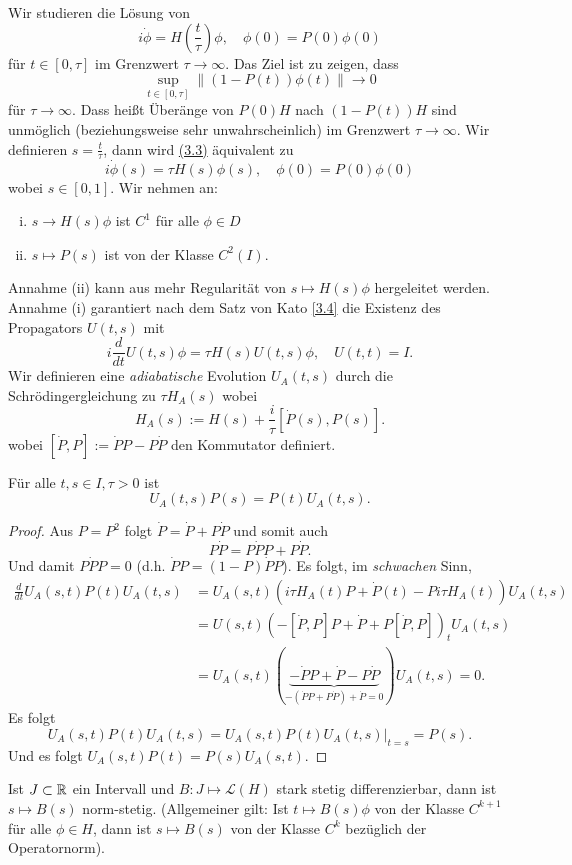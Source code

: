 \documentclass{mycourse}
\renewcommand{\eqref}[1]{\hyperref[#1]{(#1)}}
\begin{document}
Wir studieren die Lösung von
\begin{equation}\label{3.3}
i \dot \phi = H(\frac{t}{\tau}) \phi,\quad \phi(0)= P(0) \phi(0)
\end{equation}
für $t\in [0, \tau]$ im Grenzwert $\tau \to \infty$. Das Ziel ist zu zeigen, dass
\[
\sup_{t\in [0, \tau]} \| (1- P(t)) \phi(t) \| \to 0
\]
für $\tau \to \infty$. Dass heißt Überänge von $P(0) H$ nach $(1- P(t))H$ sind unmöglich (beziehungsweise sehr unwahrscheinlich) im Grenzwert $\tau \to \infty$. Wir definieren $s=\frac{t}{\tau}$, dann wird \eqref{3.3} äquivalent zu
\[
i \dot \phi(s) = \tau H(s) \phi(s), \quad \phi(0)= P(0) \phi(0)
\]
wobei $s\in [0,1]$. Wir nehmen an:
\begin{enumerate}[(i)]
\item $s\to H(s) \phi$ ist $C^1$ für alle $\phi\in D$
\item $s\mapsto P(s)$ ist von der Klasse $C^2(I)$.
\end{enumerate}
Annahme (ii) kann aus mehr Regularität von $s\mapsto H(s) \phi$ hergeleitet werden. Annahme (i) garantiert nach dem Satz von Kato \ref{3.4} die Existenz des Propagators $U(t,s)$ mit
\[
i \frac{d}{dt} U(t,s) \phi= \tau H(s) U(t,s) \phi, \quad U(t,t) = I.
\]
Wir definieren eine \emph{adiabatische} Evolution $U_A(t,s)$ durch die Schrödingergleichung zu $\tau H_A(s)$ wobei
\[
H_A(s):= H(s) + \frac{i}{\tau} [\dot P(s), P(s)].
\]
wobei $[\dot P, P]:= \dot P P - P \dot P$ den Kommutator definiert.
\begin{lem} Für alle $t,s \in I, \tau >0$ ist
\[
U_A(t,s) P(s) = P(t) U_A(t,s).
\]
\end{lem}
\begin{proof}
Aus $P=P^2$ folgt $\dot P=\dot P + P \dot P$ und somit auch
\[
P\dot P = P \dot P P + P \dot P.
\]
Und damit $P\dot P P =0$ (d.h. $\dot P P = (1-P) \dot PP$). Es folgt, im \emph{schwachen} Sinn,
\begin{align*}
\frac{d}{dt} U_A(s,t) P(t) U_A(t,s)&= U_A(s,t) (i \tau H_A(t) P+ \dot P(t)-P i\tau H_A(t))U_A(t,s)\\
&=U(s,t)(-[\dot P, P] P+ \dot P + P [\dot P, P])_t U_A(t,s)\\
&= U_A(s,t) (\underbrace{-\dot P P + \dot P - P \dot P}_{-(\dot P P + P \dot P) + \dot P=0}) U_A(t,s)=0.
\end{align*}
Es folgt
\[
U_A(s,t) P(t) U_A(t,s) = U_A(s,t) P(t) U_A(t,s)\big|_{t=s} = P(s).
\]
Und es folgt $U_A(s,t)P(t)=P(s) U_A(s,t)$.
\end{proof}

\begin{lem}\label{3.6}
Ist $J\subset \mathbb{R}$ ein Intervall und $B: J \mapsto \mathcal L(H)$ stark stetig differenzierbar, dann ist $s\mapsto B(s)$ norm-stetig. (Allgemeiner gilt: Ist $t\mapsto B(s) \phi$ von der Klasse $C^{k+1}$ für alle $\phi \in H$, dann ist $s\mapsto B(s)$ von der Klasse $C^k$ bezüglich der Operatornorm).
\end{lem}
\end{document}
